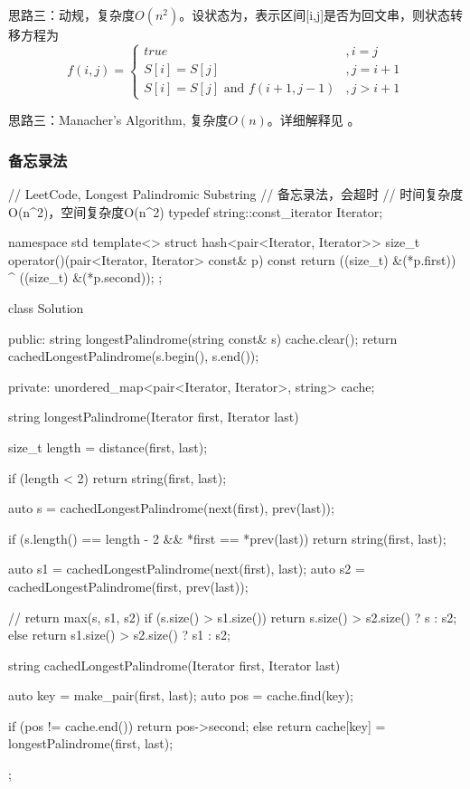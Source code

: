 思路三：动规，复杂度$O(n^2)$。设状态为，表示区间[i,j]是否为回文串，则状态转移方程为
$$
f(i,j)=\begin{cases}
true & ,i=j\\
S[i]=S[j] & , j = i + 1 \\
S[i]=S[j] \text{ and } f(i+1, j-1) & , j > i + 1
\end{cases}
$$

思路三：Manacher’s Algorithm, 复杂度$O(n)$。详细解释见  。


\subsubsection{备忘录法}
\begin{Code}
// LeetCode, Longest Palindromic Substring
// 备忘录法，会超时
// 时间复杂度O(n^2)，空间复杂度O(n^2)
typedef string::const_iterator Iterator;

namespace std {
template<>
struct hash<pair<Iterator, Iterator>> {
    size_t operator()(pair<Iterator, Iterator> const& p) const {
        return ((size_t) &(*p.first)) ^ ((size_t) &(*p.second));
    }
};
}

class Solution {
public:
    string longestPalindrome(string const& s) {
        cache.clear();
        return cachedLongestPalindrome(s.begin(), s.end());
    }

private:
    unordered_map<pair<Iterator, Iterator>, string> cache;

    string longestPalindrome(Iterator first, Iterator last) {
        size_t length = distance(first, last);

        if (length < 2) return string(first, last);

        auto s = cachedLongestPalindrome(next(first), prev(last));

        if (s.length() == length - 2 && *first == *prev(last))
            return string(first, last);

        auto s1 = cachedLongestPalindrome(next(first), last);
        auto s2 = cachedLongestPalindrome(first, prev(last));

        // return max(s, s1, s2)
        if (s.size() > s1.size()) return s.size() > s2.size() ? s : s2;
        else return s1.size() > s2.size() ? s1 : s2;
    }

    string cachedLongestPalindrome(Iterator first, Iterator last) {
        auto key = make_pair(first, last);
        auto pos = cache.find(key);

        if (pos != cache.end()) return pos->second;
        else return cache[key] = longestPalindrome(first, last);
    }
};
\end{Code}


